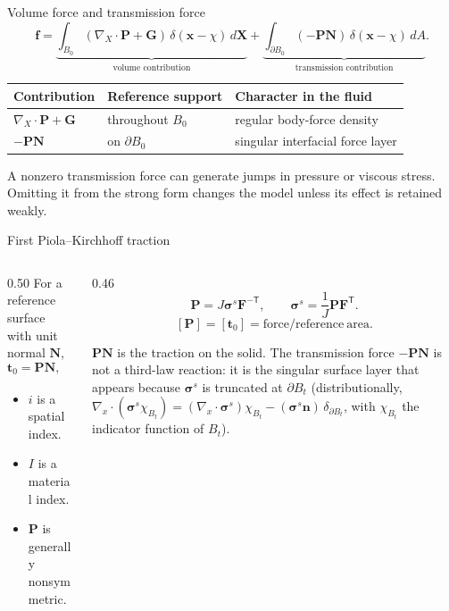 \documentclass[aspectratio=169,11pt]{beamer}
\newcommand{\xvec}{\bm{x}}
\newcommand{\Xvec}{\bm{X}}
\newcommand{\fvec}{\bm{f}}
\newcommand{\Gvec}{\bm{G}}
\newcommand{\Nvec}{\bm{N}}
\newcommand{\nvec}{\bm{n}}
\newcommand{\Ften}{\bm{F}}
\newcommand{\Pten}{\bm{P}}
\newcommand{\sigten}{\bm{\sigma}}
\newcommand{\Div}{\nabla_{\!X}\!\cdot}
\newcommand{\gradx}{\nabla_{\!x}}
\begin{document}
\begin{frame}{Volume force and transmission force}
\[
  \fvec
  =
  \underbrace{\int_{B_0}(\Div\Pten+\Gvec)\,
  \delta(\xvec-\chi)\,d\Xvec}_{\text{volume contribution}}
  +
  \underbrace{\int_{\partial B_0}(-\Pten\Nvec)\,
  \delta(\xvec-\chi)\,dA}_{\text{transmission contribution}} .
\]
\begin{center}
\renewcommand{\arraystretch}{1.25}
\begin{tabular}{lll}
\toprule
Contribution & Reference support & Character in the fluid \\
\midrule
\(\Div\Pten+\Gvec\) & throughout \(B_0\) & regular body-force density \\
\(-\Pten\Nvec\) & on \(\partial B_0\) & singular interfacial force layer \\
\bottomrule
\end{tabular}
\end{center}
\medskip
\begin{punchbox}
\small A nonzero transmission force can generate jumps in pressure or viscous stress. Omitting it from the strong form changes the model unless its effect is retained weakly.
\end{punchbox}
\end{frame}

\begin{frame}{First Piola--Kirchhoff traction}
\begin{columns}[T,onlytextwidth]
\begin{column}{0.50\textwidth}
For a reference surface with unit normal \(\Nvec\),
\[
  \bm{t}_0=\Pten\Nvec,
  \qquad
  (t_0)_i=P_{iI}N_I .
\]
\begin{itemize}\itemsep5pt
  \item \(i\) is a spatial index.
  \item \(I\) is a material index.
  \item \(\Pten\) is generally nonsymmetric.
\end{itemize}
\end{column}
\begin{column}{0.46\textwidth}
\[
  \Pten=J\sigten^s\Ften^{-\mathsf T},
  \qquad
  \sigten^s=\frac{1}{J}\Pten\Ften^{\mathsf T}.
\]
\[
  [\Pten]=[\bm{t}_0]
  =\mathrm{force/reference\ area}.
\]
\begin{punchbox}
\small \(\Pten\Nvec\) is the traction on the solid. The transmission force \(-\Pten\Nvec\) is not a third-law reaction: it is the singular surface layer that appears because \(\sigten^{s}\) is truncated at \(\partial B_t\) (distributionally, \(\gradx\!\cdot(\sigten^{s}\chi_{B_t})=(\gradx\!\cdot\sigten^{s})\chi_{B_t}-(\sigten^{s}\nvec)\,\delta_{\partial B_t}\), with \(\chi_{B_t}\) the indicator function of \(B_t\)).
\end{punchbox}
\end{column}
\end{columns}
\end{frame}
\end{document}
